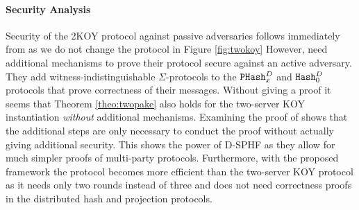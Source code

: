 \paragraph{Security Analysis}
Security of the 2KOY protocol against passive adversaries follows immediately from \cite[Theorem 1]{Katz2012a} as we do not change the protocol in Figure \ref{fig:twokoy}
However, \citet{Katz2012a} need additional mechanisms to prove their protocol secure against an active adversary.
They add witness-indistinguishable $\Sigma$-protocols to the $\mathtt{PHash}_x^{D}$ and $\mathtt{Hash}_0^{D}$ protocols that prove correctness of their messages.
Without giving a proof it seems that Theorem \ref{theo:twopake} also holds for the two-server KOY instantiation \emph{without} additional mechanisms.
Examining the proof of \cite[Theorem 2]{Katz2012a} shows that the additional steps are only necessary to conduct the proof without actually giving additional security.
This shows the power of \ac{D-SPHF} as they allow for much simpler proofs of multi-party protocols.
Furthermore, with the proposed framework the protocol becomes more efficient than the two-server KOY protocol as it needs only two rounds instead of three and does not need correctness proofs in the distributed hash and projection protocols.
